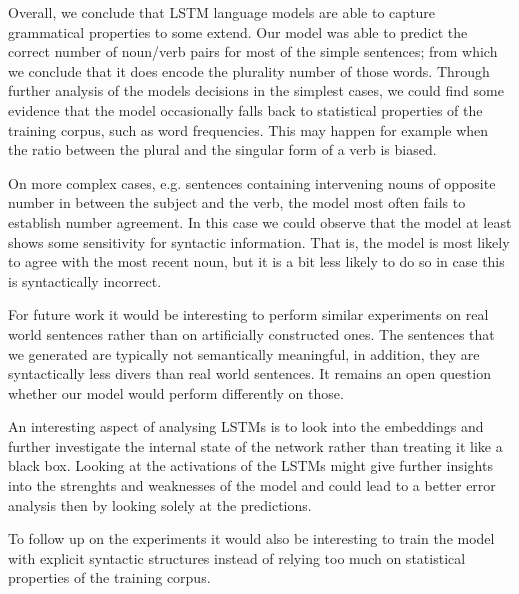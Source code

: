\documentclass[11pt,a4paper]{article}
\begin{document}
Overall, we conclude that LSTM language models
are able to capture grammatical properties to some extend.
Our model was able to predict the correct number of noun/verb pairs 
for most of the simple sentences;
from which we conclude that it does encode the plurality number of those words. 
Through further analysis of the models decisions in the simplest cases, we could find some evidence that the model occasionally falls back to statistical properties of the training corpus, such as word frequencies.
This may happen for example when the ratio between the plural 
and the singular form of a verb is biased.

On more complex cases, e.g. sentences containing intervening nouns 
of opposite number
in between the subject and the verb, 
the model most often fails to establish number agreement. 
In this case we could observe that the model at least shows 
some sensitivity for syntactic information.
That is, the model is most likely to agree with the
most recent noun, but it is a bit less likely to do so 
in case this is syntactically incorrect.

For future work it would be interesting to perform similar experiments on real world sentences rather than on artificially constructed ones. 
The sentences that we generated are typically not semantically meaningful,
in addition, they are syntactically less divers than real world sentences. 
It remains an open question whether our model would perform differently on those.

An interesting aspect of analysing LSTMs is to look into the embeddings and further investigate the internal state of the network rather than treating it like a black box. Looking at the activations of the LSTMs might give further insights into the strenghts and weaknesses of the model and could lead to a better error analysis then by looking solely at the predictions. 

To follow up on the experiments it would also be interesting to train the model with explicit syntactic structures instead of relying too much on statistical properties of the training corpus.





%
%




\end{document}
